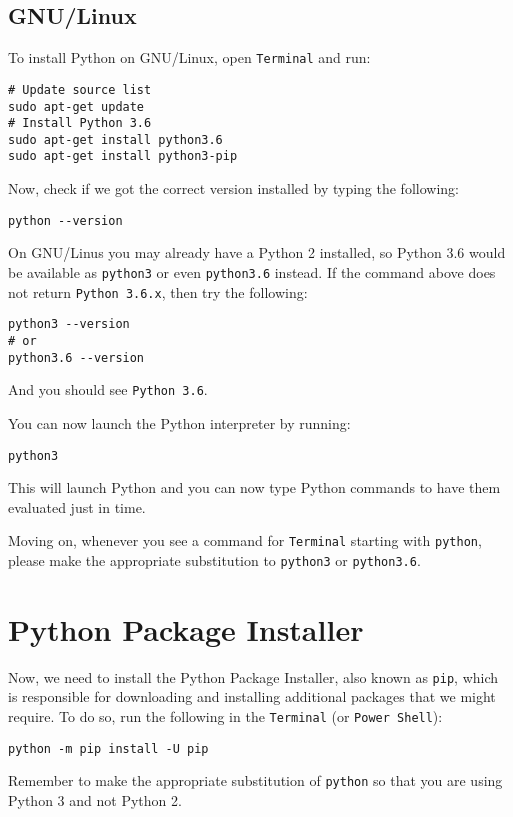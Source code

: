 \documentclass[12pt, a4paper]{article}
\begin{document}
\subsection*{GNU/Linux}
\label{sec:org55077fd}
To install Python on GNU/Linux, open \texttt{Terminal} and run:
\lstset{language=bash,label= ,caption= ,captionpos=b,firstnumber=1,numbers=left,style=bash}
\begin{lstlisting}
# Update source list
sudo apt-get update
# Install Python 3.6
sudo apt-get install python3.6
sudo apt-get install python3-pip
\end{lstlisting}
Now, check if we got the correct version installed by typing the following:
\lstset{language=bash,label= ,caption= ,captionpos=b,firstnumber=1,numbers=left,style=bash}
\begin{lstlisting}
python --version
\end{lstlisting}
On GNU/Linus you may already have a Python 2 installed, so Python 3.6 would be available as \texttt{python3} or even \texttt{python3.6} instead.
If the command above does not return \texttt{Python 3.6.x}, then try the following:
\lstset{language=bash,label= ,caption= ,captionpos=b,firstnumber=1,numbers=left,style=bash}
\begin{lstlisting}
python3 --version
# or
python3.6 --version
\end{lstlisting}
And you should see \texttt{Python 3.6}.

You can now launch the Python interpreter by running:
\lstset{language=bash,label= ,caption= ,captionpos=b,firstnumber=1,numbers=left,style=bash}
\begin{lstlisting}
python3
\end{lstlisting}
This will launch Python and you can now type Python commands to have them evaluated just in time.

Moving on, whenever you see a command for \texttt{Terminal} starting with \texttt{python}, please make the appropriate substitution to \texttt{python3} or \texttt{python3.6}.
\section*{Python Package Installer}
\label{sec:orga74b61e}
Now, we need to install the Python Package Installer, also known as \texttt{pip}, which is responsible for downloading and installing additional packages that we might require.
To do so, run the following in the \texttt{Terminal} (or \texttt{Power Shell}):
\lstset{language=bash,label= ,caption= ,captionpos=b,firstnumber=1,numbers=left,style=bash}
\begin{lstlisting}
python -m pip install -U pip
\end{lstlisting}
Remember to make the appropriate substitution of \texttt{python} so that you are using Python 3 and not Python 2.
\end{document}
